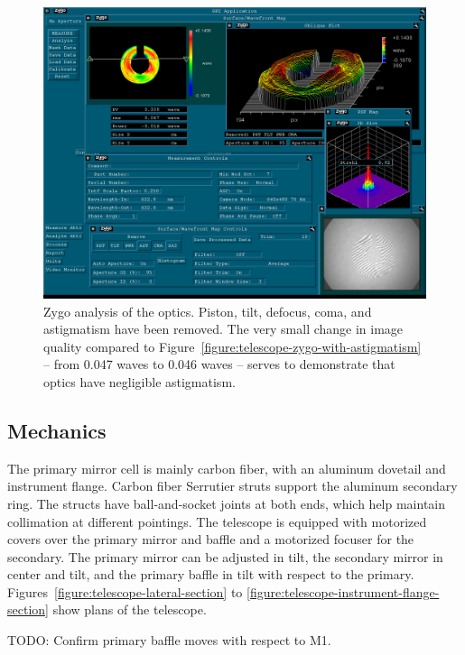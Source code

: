 \begin{figure}
\begin{center}
\includegraphics[width=1.0\linewidth]{figures/telescope-zygo-with-astigmatism.jpg}
\end{center}
\caption{Zygo analysis of the optics. Piston, tilt, defocus, coma, and astigmatism have been removed. The very small change in image quality compared to Figure~\ref{figure:telescope-zygo-with-astigmatism} -- from 0.047 waves to 0.046 waves -- serves to demonstrate that optics have negligible astigmatism.}
\label{figure:telescope-zygo-without-astigmatism}
\end{figure}

\subsection{Mechanics}

The primary mirror cell is mainly carbon fiber, with an aluminum dovetail and instrument flange. Carbon fiber Serrutier struts support the aluminum secondary ring. The structs have ball-and-socket joints at both ends, which help maintain collimation at different pointings. The telescope is equipped with motorized covers over the primary mirror and baffle and a motorized focuser for the secondary. The primary mirror can be adjusted in tilt, the secondary mirror in center and tilt, and the primary baffle in tilt with respect to the primary. Figures~\ref{figure:telescope-lateral-section} to \ref{figure:telescope-instrument-flange-section} show plans of the telescope.

TODO: Confirm primary baffle moves with respect to M1.

